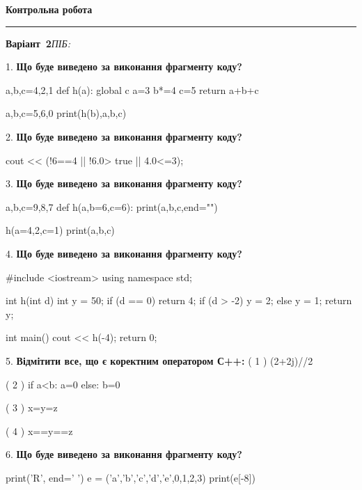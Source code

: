 \documentclass[11pt]{article}
\begin{document}
{\centering\Large\bfseries Контрольна робота\par}
\medskip
\noindent\rule{\linewidth}{0.5pt}
\smallskip
\noindent\textbf{Варіант \No\,2}\hfill \textit{ПІБ:}\,\underline{\hspace{60mm}}
\vspace{4mm}

1. \textbf{Що буде виведено за виконання фрагменту коду?}

a,b,c=4,2,1
def h(a):
global c    a=3
    b*=4
    c=5
    return a+b+c

a,b,c=5,6,0
print(h(b),a,b,c)
\vspace{5mm}

2. \textbf{Що буде виведено за виконання фрагменту коду?}

cout << (!6==4 || !6.0> true || 4.0<=3);
\vspace{5mm}

3. \textbf{Що буде виведено за виконання фрагменту коду?}

a,b,c=9,8,7
def h(a,b=6,c=6):
    print(a,b,c,end="")

h(a=4,2,c=1)
print(a,b,c)

\vspace{5mm}

4. \textbf{Що буде виведено за виконання фрагменту коду?}

#include <iostream>
using namespace std;

int h(int d){
    int y = 50;
    if (d == 0) 
        return 4;
    if (d > -2)
         y = 2;
    else
         y = 1;
    return y;
}

int main(){
    cout << h(-4);
    return 0;
}

\vspace{5mm}

5. %
\textbf{Відмітити все, що є коректним оператором С++:}
( 1 ) (2+2j)//2

( 2 ) if a<b: a=0 else: b=0

( 3 ) x=y=z

( 4 ) x==y==z
\vspace{5mm}

6. \textbf{Що буде виведено за виконання фрагменту коду?}

print('R', end=' ')
e = ('a','b','c','d','e',0,1,2,3)
print(e[-8])

\vspace{5mm}
\end{document}
